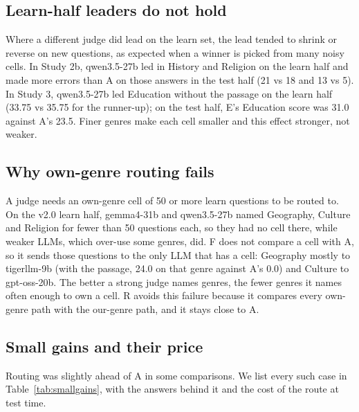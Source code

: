 \documentclass[pdflatex,sn-apa]{sn-jnl}
\begin{document}
\subsection{Learn-half leaders do not hold}

Where a different judge did lead on the learn set, the lead tended to shrink or reverse on new questions, as expected
when a winner is picked from many noisy cells. In Study 2b, qwen3.5-27b led in History and Religion on the learn half
and made more errors than A on those answers in the test half (21 vs 18 and 13 vs 5). In Study 3, qwen3.5-27b led
Education without the passage on the learn half (33.75 vs 35.75 for the runner-up); on the test half, E's Education
score was 31.0 against A's 23.5. Finer genres make each cell smaller and this effect stronger, not weaker.

\subsection{Why own-genre routing fails}\label{sec:whyf}

A judge needs an own-genre cell of 50 or more learn questions to be routed to. On the v2.0 learn half, gemma4-31b and
qwen3.5-27b named Geography, Culture and Religion for fewer than 50 questions each, so they had no cell there, while
weaker LLMs, which over-use some genres, did. F does not compare a cell with A, so it sends those questions to the only
LLM that has a cell: Geography mostly to tigerllm-9b (with the passage, 24.0 on that genre against A's 0.0) and
Culture to gpt-oss-20b. The better a strong judge names genres, the fewer genres it names often enough to own a cell.
R avoids this failure because it compares every own-genre path with the our-genre path, and it stays close to A.

\subsection{Small gains and their price}\label{sec:cost}

Routing was slightly ahead of A in some comparisons. We list every such case in Table~\ref{tab:smallgains}, with the
answers behind it and the cost of the route at test time.
\end{document}
